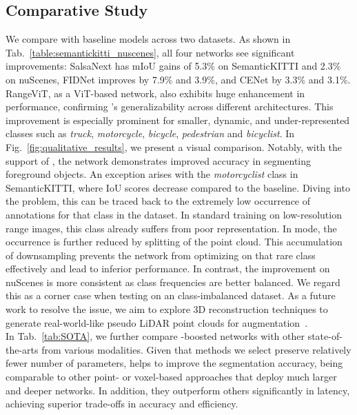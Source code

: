 \subsection{Comparative Study}

We compare \coolname{} with baseline models across two datasets. As shown in Tab.~\ref{table:semantickitti_nuscenes}, all four networks see significant improvements: SalsaNext has mIoU gains of 5.3\% on SemanticKITTI and 2.3\% on nuScenes, FIDNet improves by 7.9\% and 3.9\%, and CENet by 3.3\% and 3.1\%. RangeViT, as a ViT-based network, also exhibits huge enhancement in performance, confirming \coolname{}'s generalizability across different architectures. This improvement is especially prominent for smaller, dynamic, and under-represented classes such as \textit{truck}, \textit{motorcycle}, \textit{bicycle}, \textit{pedestrian} and \textit{bicyclist}. In Fig.~\ref{fig:qualitative_results}, we present a visual comparison. Notably, with the support of \coolname{}, the network demonstrates improved accuracy in segmenting foreground objects. An exception arises with the \textit{motorcyclist} class in SemanticKITTI, where IoU scores decrease compared to the baseline. Diving into the problem, this can be traced back to the extremely low occurrence of annotations for that class in the dataset. In standard training on low-resolution range images, this class already suffers from poor representation. In \coolname{} mode, the occurrence is further reduced by splitting of the point cloud. This accumulation of downsampling prevents the network from optimizing on that rare class effectively and lead to inferior performance. In contrast, the improvement on nuScenes is more consistent as class frequencies are better balanced. We regard this as a corner case when testing on an class-imbalanced dataset. As a future work to resolve the issue, we aim to explore 3D reconstruction techniques to generate real-world-like pseudo LiDAR point clouds for augmentation~\cite{chang2024just, manivasagam2020lidarsim}.\\
\noindent In Tab.~\ref{tab:SOTA}, we further compare \coolname{}-boosted networks with other state-of-the-arts from various modalities. Given that methods we select preserve relatively fewer number of parameters, \coolname{} helps to improve the segmentation accuracy, being comparable to other point- or voxel-based approaches that deploy much larger and deeper networks. In addition, they outperform others significantly in latency, achieving superior trade-offs in accuracy and efficiency.


